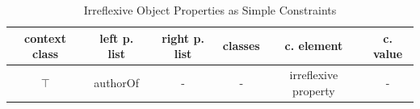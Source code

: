 \documentclass[a4paper,fontsize=11pt]{scrartcl}
\begin{document}

\begin{table}[H]
  \scriptsize
  \sffamily
  \vspace{0cm}
	\caption{Irreflexive Object Properties as Simple Constraints}
	\label{tab:irreflexive-object-properties-as-simple-constraints}
	\centering
		\begin{tabular}{c|c|c|c|c|c}
      \textbf{context class} & \textbf{left p. list} & \textbf{right p. list} & \textbf{classes} & \textbf{c. element} & \textbf{c. value} \\
      \hline
$\top$ & authorOf & - & - & irreflexive property & - \\
		\end{tabular}
\end{table}
\end{document}
